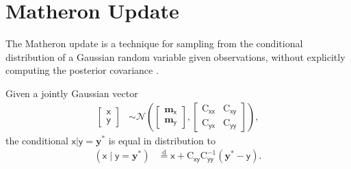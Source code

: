 \documentclass[wcp]{jmlr} %
\newcommand{\vv}[1]{\boldsymbol{#1}}
\newcommand{\mm}[1]{\mathrm{#1}}
\newcommand{\rv}[1]{\mathsf{#1}}
\newcommand{\vrv}[1]{\vv{\rv{#1}}}
\newcommand{\disteq}{\stackrel{\mathrm{d}}{=}}
\newcommand{\Normal}{\mathcal{N}}
\newcommand{\gvn}{\mid}
\begin{document}
\section{Matheron Update}

The Matheron update is a technique for sampling from the conditional distribution of a Gaussian random variable given observations, without explicitly computing the posterior covariance \citep{Doucet2010Note,Wilson2020Efficiently,Wilson2021Pathwise}.

\begin{lemma}
Given a jointly Gaussian vector
\begin{align}
    \begin{bmatrix} \vrv{x} \\ \vrv{y} \end{bmatrix}
    &\sim \Normal\left(\begin{bmatrix} \vv{m}_{\vrv{x}} \\ \vv{m}_{\vrv{y}} \end{bmatrix}, \begin{bmatrix} \mm{C}_{\vrv{xx}} & \mm{C}_{\vrv{xy}} \\ \mm{C}_{\vrv{yx}} & \mm{C}_{\vrv{yy}} \end{bmatrix}\right), \label{eq:joint-gaussian}
\end{align}
the conditional $\vrv{x} | \vrv{y} {=} \vv{y}^*$ is equal in distribution to
\begin{align}
    \left(\vrv{x} \gvn \vrv{y} {=} \vv{y}^*\right)
    &\disteq \vrv{x} + \mm{C}_{\vrv{xy}} \mm{C}_{\vrv{yy}}^{-1} \left( \vv{y}^* - \vrv{y} \right).
    \label{eq:matheron-update}
\end{align}
\end{lemma}
\end{document}
